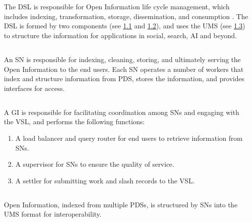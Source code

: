 \section{}
\label{sec:DSL}

The \gls{DSL} is responsible for Open Information life cycle management, which includes indexing, transformation, storage, dissemination, and consumption \cite{nationalinstituteofstandardsandtechnology2016Information}. The \gls{DSL} is formed by two components (see \cref{subsec:SN} and \cref{subsec:GI}), and uses the \gls{UMS} (see \cref{subsec:UMS}) to structure the information for applications in social, search, AI and beyond.

\subsection{}
\label{subsec:SN}

An \gls{SN} is responsible for indexing, cleaning, storing, and ultimately serving the Open Information to the end users. Each \gls{SN} operates a number of workers that index and structure information from \gls{PDS}, stores the information, and provides interfaces for access.

\subsection{}
\label{subsec:GI}

A \gls{GI} is responsible for facilitating coordination among \glspl{SN} and engaging with the \gls{VSL}, and performs the following functions:
\begin{enumerate}
    \item A load balancer and query router for end users to retrieve information from \glspl{SN}.
    \item A supervisor for \glspl{SN} to ensure the quality of service.
    \item A settler for submitting work and slash records to the \gls{VSL}.
\end{enumerate}


\subsection{}
\label{subsec:UMS}

Open Information, indexed from multiple \glspl{PDS}, is structured by \glspl{SN} into the \gls{UMS} format for interoperability.

